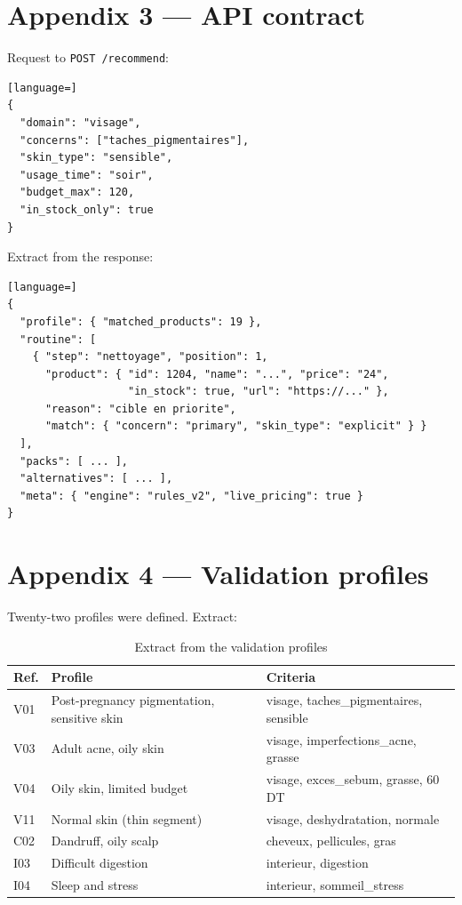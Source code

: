 \section*{Appendix 3 --- API contract}

Request to \texttt{POST /recommend}:

\begin{lstlisting}[language=]
{
  "domain": "visage",
  "concerns": ["taches_pigmentaires"],
  "skin_type": "sensible",
  "usage_time": "soir",
  "budget_max": 120,
  "in_stock_only": true
}
\end{lstlisting}

Extract from the response:

\begin{lstlisting}[language=]
{
  "profile": { "matched_products": 19 },
  "routine": [
    { "step": "nettoyage", "position": 1,
      "product": { "id": 1204, "name": "...", "price": "24",
                   "in_stock": true, "url": "https://..." },
      "reason": "cible en priorite",
      "match": { "concern": "primary", "skin_type": "explicit" } }
  ],
  "packs": [ ... ],
  "alternatives": [ ... ],
  "meta": { "engine": "rules_v2", "live_pricing": true }
}
\end{lstlisting}

\section*{Appendix 4 --- Validation profiles}

Twenty-two profiles were defined. Extract:

\begin{table}[H]
\caption{Extract from the validation profiles}
\label{tab:profiles}
\centering
\begin{tabularx}{\textwidth}{l L{4.6cm} X}
\toprule
\textbf{Ref.} & \textbf{Profile} & \textbf{Criteria} \\
\midrule
V01 & Post-pregnancy pigmentation, sensitive skin & visage, taches\_pigmentaires, sensible \\
V03 & Adult acne, oily skin & visage, imperfections\_acne, grasse \\
V04 & Oily skin, limited budget & visage, exces\_sebum, grasse, 60 DT \\
V11 & Normal skin (thin segment) & visage, deshydratation, normale \\
C02 & Dandruff, oily scalp & cheveux, pellicules, gras \\
I03 & Difficult digestion & interieur, digestion \\
I04 & Sleep and stress & interieur, sommeil\_stress \\
\bottomrule
\end{tabularx}
\end{table}

